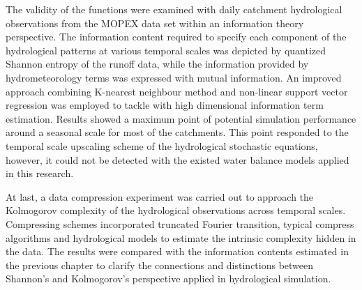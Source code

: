 \documentclass{article}
\begin{document}
The validity of the functions were examined with daily catchment hydrological observations from the MOPEX data set within  an information theory perspective. The information content required to specify each component of the hydrological patterns at various temporal scales was depicted by quantized Shannon entropy of the runoff data, while the information provided by hydrometeorology terms was expressed with mutual information. An improved approach combining K-nearest neighbour method and  non-linear support vector regression was employed to tackle with high dimensional information term estimation. Results showed a maximum point of potential simulation performance around a seasonal scale for most of the catchments. This point responded to the temporal scale upscaling scheme of the hydrological stochastic equations, however, it could not be detected with the existed water balance models applied in this research.   

At last, a data compression experiment was carried out to approach the Kolmogorov complexity of the hydrological observations across temporal scales. Compressing schemes incorporated truncated Fourier transition, typical compress algorithms and hydrological models to estimate the intrinsic complexity hidden in the data. The results were compared with the information contents estimated in the previous chapter to clarify the  connections and distinctions between Shannon's and Kolmogorov's  perspective applied in hydrological simulation.  
  
 
\end{document}

